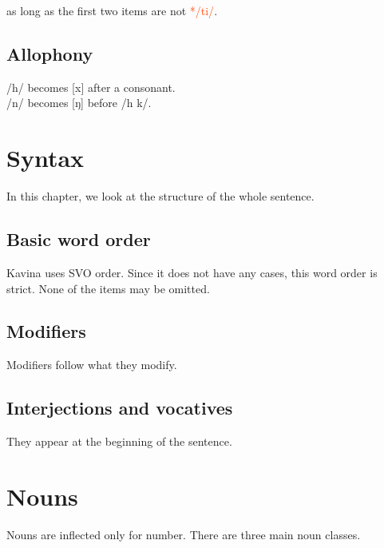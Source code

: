 \documentclass{book}
\newcommand{\ortho}[1]{⟨#1⟩}
\newcommand{\wrongp}[1]{\textcolor{OrangeRed}{*/#1/}}
\begin{document}
as long as the first two items are not \wrongp{ti}.

\section{Allophony}

/h/ becomes [x] after a consonant. \\
/n/ becomes [ŋ] before /h k/.

\chapter{Syntax}

In this chapter, we look at the structure of the whole sentence.

\section{Basic word order}

Kavina uses SVO order. Since it does not have any cases, this word order is strict. None of the items may be omitted.

\section{Modifiers}

Modifiers follow what they modify.

\section{Interjections and vocatives}

They appear at the beginning of the sentence.

\chapter{Nouns}

Nouns are inflected only for number. There are three main noun classes.

\newcommand{\decltab}[4]{
    \begin{table}[htbp]
        \centering
        \caption{Declension of \ortho{#3#1} \emph{#4}}
        \begin{tabu} to \textwidth {|p{3cm}|p{2cm}|X|}
            \hline
            Singular & -#1 & #3#1 \\ \hline
            Plural & -#2 & #3#2 \\ \hline
        \end{tabu}
    \end{table}
}
\end{document}
